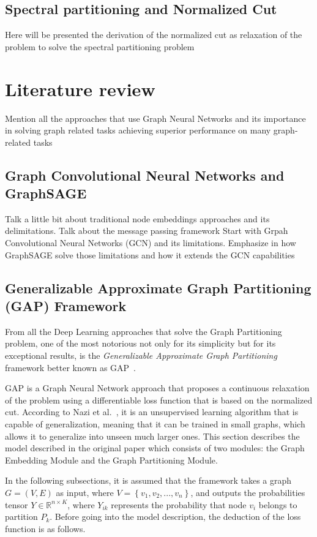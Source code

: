 
\subsection{Spectral partitioning and Normalized Cut}
Here will be presented the derivation of the normalized cut as relaxation of the problem to solve the spectral partitioning problem

\section{Literature review}
Mention all the approaches that use Graph Neural Networks and its importance in solving graph related tasks
achieving superior performance on many graph-related tasks
\subsection{Graph Convolutional Neural Networks and GraphSAGE}
Talk a little bit about traditional node embeddings approaches and its delimitations.
Talk about the message passing framework
Start with Grpah Convolutional Neural Networks (GCN) and its limitations. Emphasize in how GraphSAGE solve those limitations and how it extends the GCN capabilities
\subsection{Generalizable Approximate Graph Partitioning (GAP) Framework}
From all the Deep Learning approaches that solve the Graph Partitioning problem, one of the most notorious not only for its simplicity but for its exceptional results, is the \textit{Generalizable Approximate Graph Partitioning} framework better known as GAP~\cite{gap1}.

GAP is a Graph Neural Network approach that proposes a continuous relaxation of the problem using a differentiable loss function that is based on the normalized cut. According to Nazi et al.~\cite{gap}, it is an unsupervised learning algorithm that is capable of generalization, meaning that it can be trained in small graphs, which allows it to generalize into unseen much larger ones. This section describes the model described in the original paper which consists of two modules: the Graph Embedding Module and the Graph Partitioning Module.

In the following subsections, it is assumed that the framework takes a graph $G = (V, E)$ as input, where $V = \left\{ v_1, v_2, ..., v_n\right\}$, and outputs the probabilities tensor $Y\in \mathbb R^{n\times K}$, where $Y_{ik}$ represents the probability that node $v_i$ belongs to partition $P_k$. %
Before going into the model description, the deduction of the loss function is as follows.

